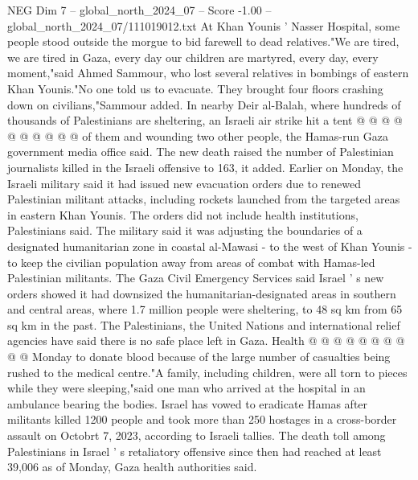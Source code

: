 \begin{textsample}{NEG Dim 7 – global\_north\_2024\_07 – Score -1.00 – global\_north\_2024\_07/111019012.txt}
At Khan Younis ' Nasser Hospital, some people stood outside the morgue to bid farewell to dead relatives."We are tired, we are tired in Gaza, every day our children are martyred, every day, every moment,"said Ahmed Sammour, who lost several relatives in bombings of eastern Khan Younis."No one told us to evacuate.
They brought four floors crashing down on civilians,"Sammour added.
In nearby Deir al-Balah, where hundreds of thousands of Palestinians are sheltering, an Israeli air strike hit a tent @ @ @ @ @ @ @ @ @ @ of them and wounding two other people, the Hamas-run Gaza government media office said.
The new death raised the number of Palestinian journalists killed in the Israeli offensive to 163, it added.
Earlier on Monday, the Israeli military said it had issued new evacuation orders due to renewed Palestinian militant attacks, including rockets launched from the targeted areas in eastern Khan Younis.
The orders did not include health institutions, Palestinians said.
The military said it was adjusting the boundaries of a designated humanitarian zone in coastal al-Mawasi - to the west of Khan Younis - to keep the civilian population away from areas of combat with Hamas-led Palestinian militants.
The Gaza Civil Emergency Services said Israel ' s new orders showed it had downsized the humanitarian-designated areas in southern and central areas, where 1.7 million people were sheltering, to 48 sq km from 65 sq km in the past.
The Palestinians, the United Nations and international relief agencies have said there is no safe place left in Gaza.
Health @ @ @ @ @ @ @ @ @ @ Monday to donate blood because of the large number of casualties being rushed to the medical centre."A family, including children, were all torn to pieces while they were sleeping,"said one man who arrived at the hospital in an ambulance bearing the bodies.
Israel has vowed to eradicate Hamas after militants killed 1200 people and took more than 250 hostages in a cross-border assault on Octobrt 7, 2023, according to Israeli tallies.
The death toll among Palestinians in Israel ' s retaliatory offensive since then had reached at least 39,006 as of Monday, Gaza health authorities said.

\end{textsample}
